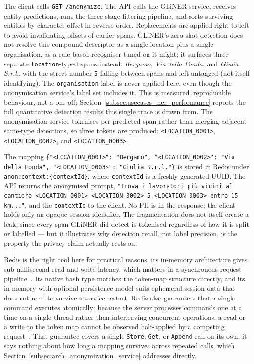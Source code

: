 The client calls \texttt{GET /anonymize}. The API calls the GLiNER service, receives entity predictions, runs the three-stage filtering pipeline, and sorts surviving entities by character offset in reverse order. Replacements are applied right-to-left to avoid invalidating offsets of earlier spans. GLiNER's zero-shot detection does not resolve this compound descriptor as a single location plus a single organisation, as a rule-based recogniser tuned on it might; it surfaces three separate \texttt{location}-typed spans instead: \emph{Bergamo}, \emph{Via della Fonda}, and \emph{Giulia S.r.l.}, with the street number \texttt{5} falling between spans and left untagged (not itself identifying). The \texttt{organisation} label is never applied here, even though the anonymisation service's label set includes it. This is measured, reproducible behaviour, not a one-off; Section~\ref{subsec:usecases_ner_performance} reports the full quantitative detection results this single trace is drawn from. The anonymisation service tokenises per predicted span rather than merging adjacent same-type detections, so three tokens are produced: \texttt{<LOCATION\_0001>}, \texttt{<LOCATION\_0002>}, and \texttt{<LOCATION\_0003>}.

The mapping \texttt{\{"<LOCATION\_0001>": "Bergamo", "<LOCATION\_0002>": "Via della Fonda", "<LOCATION\_0003>": "Giulia S.r.l."\}} is stored in Redis under \texttt{anon:context:\{contextId\}}, where \texttt{contextId} is a freshly generated UUID. The API returns the anonymised prompt, \texttt{"Trova i lavoratori più vicini al cantiere <LOCATION\_0001> <LOCATION\_0002> 5 <LOCATION\_0003> entro 15 km..."}, and the \texttt{contextId} to the client. No PII is in the response; the client holds only an opaque session identifier. The fragmentation does not itself create a leak, since every span GLiNER did detect is tokenised regardless of how it is split or labelled — but it illustrates why detection recall, not label precision, is the property the privacy claim actually rests on.

Redis is the right tool here for practical reasons: its in-memory architecture gives sub-millisecond read and write latency, which matters in a synchronous request pipeline~\cite{redis2025latency}. Its native hash type matches the token-map structure directly, and its in-memory-with-optional-persistence model suits ephemeral session data that does not need to survive a service restart. Redis also guarantees that a single command executes atomically: because the server processes commands one at a time on a single thread rather than interleaving concurrent operations, a read or a write to the token map cannot be observed half-applied by a competing request~\cite{redis2025docs}. That guarantee covers a single \texttt{Store}, \texttt{Get}, or \texttt{Append} call on its own; it says nothing about how long a mapping survives across repeated calls, which Section~\ref{subsec:arch_anonymization_service} addresses directly.

